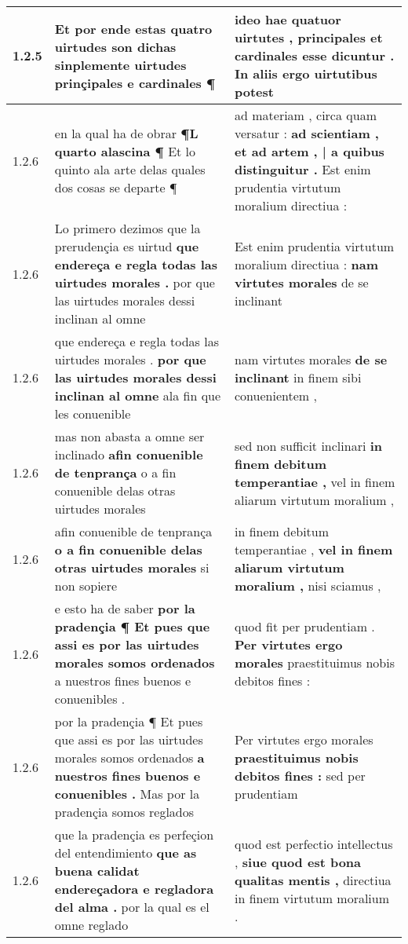 \begin{tabular}{|p{1cm}|p{6.5cm}|p{6.5cm}|}
1.2.5 & Et por ende estas quatro uirtudes son dichas \textbf{ sinplemente uirtudes prinçipales e cardinales } ¶ & ideo hae quatuor uirtutes , \textbf{ principales et cardinales esse dicuntur . } In aliis ergo uirtutibus potest \\\hline
1.2.6 & en la qual ha de obrar \textbf{ ¶L quarto alascina ¶ } Et lo quinto ala arte delas quales dos cosas se departe ¶ & ad materiam , circa quam versatur : \textbf{ ad scientiam , et ad artem , | a quibus distinguitur . } Est enim prudentia virtutum moralium directiua : \\\hline
1.2.6 & Lo primero dezimos que la prerudençia es uirtud \textbf{ que endereça e regla todas las uirtudes morales . } por que las uirtudes morales dessi inclinan al omne & Est enim prudentia virtutum moralium directiua : \textbf{ nam virtutes morales } de se inclinant \\\hline
1.2.6 & que endereça e regla todas las uirtudes morales . \textbf{ por que las uirtudes morales dessi inclinan al omne } ala fin que les conuenible & nam virtutes morales \textbf{ de se inclinant } in finem sibi conuenientem , \\\hline
1.2.6 & mas non abasta a omne ser inclinado \textbf{ afin conuenible de tenprança } o a fin conuenible delas otras uirtudes morales & sed non sufficit inclinari \textbf{ in finem debitum temperantiae , } vel in finem aliarum virtutum moralium , \\\hline
1.2.6 & afin conuenible de tenprança \textbf{ o a fin conuenible delas otras uirtudes morales } si non sopiere & in finem debitum temperantiae , \textbf{ vel in finem aliarum virtutum moralium , } nisi sciamus , \\\hline
1.2.6 & e esto ha de saber \textbf{ por la pradençia ¶ Et pues que assi es por las uirtudes morales somos ordenados } a nuestros fines buenos e conuenibles . & quod fit per prudentiam . \textbf{ Per virtutes ergo morales } praestituimus nobis debitos fines : \\\hline
1.2.6 & por la pradençia ¶ Et pues que assi es por las uirtudes morales somos ordenados \textbf{ a nuestros fines buenos e conuenibles . } Mas por la pradençia somos reglados & Per virtutes ergo morales \textbf{ praestituimus nobis debitos fines : } sed per prudentiam \\\hline
1.2.6 & que la pradençia es perfeçion del entendimiento \textbf{ que as buena calidat endereçadora e regladora del alma . } por la qual es el omne reglado & quod est perfectio intellectus , \textbf{ siue quod est bona qualitas mentis , } directiua in finem virtutum moralium . \\\hline

\end{tabular}
